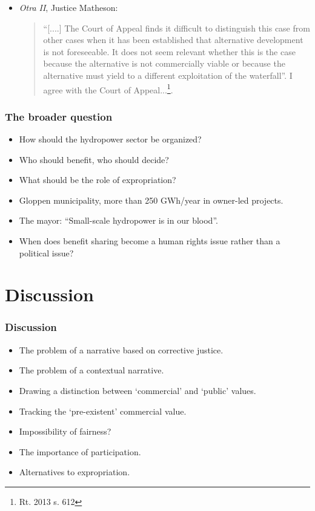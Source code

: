 \documentclass{beamer}
\begin{document}
\begin{frame}
\begin{itemize}
\item {\it Otra II}, Justice Matheson:
\begin{quote}
``[....] The Court of Appeal finds it difficult to distinguish this case from other cases when it has been established that alternative development is not foreseeable. It does not seem relevant whether this is the case because the alternative is not commercially viable or because the alternative must yield to a different exploitation of the waterfall''. I agree with the Court of Appeal...\footnote{Rt. 2013 s. 612}.\end{quote}
\end{itemize}
\end{frame}

\begin{frame}
\frametitle{The broader question}
\begin{itemize}
\item How should the hydropower sector be organized?
\item Who should benefit, who should decide?
\item What should be the role of expropriation?
\item Gloppen municipality, more than 250 GWh/year in owner-led projects.
\item The mayor: ``Small-scale hydropower is in our blood''.
\item When does benefit sharing become a human rights issue rather than a political issue?
\end{itemize}
\end{frame}

\section{Discussion}

\begin{frame}
\frametitle{Discussion}
\begin{itemize}
\item The problem of a narrative based on corrective justice.
\item The problem of a contextual narrative.
\item Drawing a distinction between `commercial' and `public' values.
\item Tracking the `pre-existent' commercial value.
\item Impossibility of fairness?
\item The importance of participation.
\item Alternatives to expropriation.
\end{itemize}
\end{frame}
\end{document}
